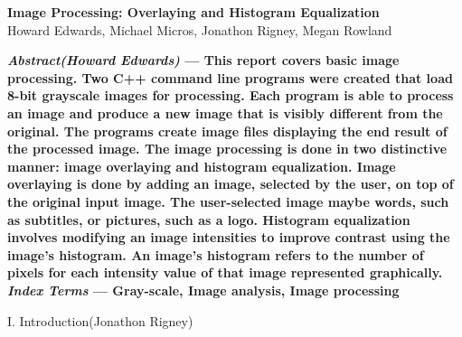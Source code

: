 \documentclass{article}
\begin{document}
\begin{center}

\vspace* {15 pt}
\Huge{\bf Image Processing: Overlaying and Histogram Equalization}\\
\vspace {20 pt}
\large{Howard Edwards, Michael Micros, Jonathon  Rigney, Megan Rowland \\}

\end{center}

\vspace{20 pt}




\begin{multicols*}{2}

{\bf  \textit {Abstract(Howard Edwards)} --- This report covers basic image processing. Two C++ command line programs were created that load 8-bit grayscale images for processing. Each program is able to process an image and produce a new image that is visibly different from the original. The programs create image files displaying the end result of the processed image. The image processing is done in two distinctive manner: image overlaying and histogram equalization. Image overlaying is done by adding an image, selected by the user, on top of the original input image. The user-selected image maybe words, such as subtitles, or pictures, such as a logo. Histogram equalization involves modifying an image intensities to improve contrast using the image’s histogram. An image’s histogram refers to the number of pixels for each intensity value of that image represented graphically.
}\\

{\bf  \textit {Index Terms} --- Gray-scale, Image analysis, Image processing
}




\begin{center}
\large{I. Introduction(Jonathon Rigney)}
\end{center}


\end{multicols*}
\end{document}
